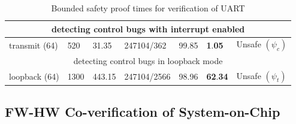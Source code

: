 \documentclass[sigconf]{acmart}
\begin{document}
\begin{table}
\begin{center}
{\begin{scriptsize}
\begin{tabular}{|l|l|l|l|l|l|l|}
\multicolumn{7}{|c|}{detecting control bugs with interrupt enabled} \\ \hline
transmit (64) & 520 & 31.35 & 247104/362 & 99.85 &
  \textbf{1}.\textbf{05} & Unsafe $(\psi_{c})$ \\ \hline
\multicolumn{7}{|c|}{detecting control bugs in loopback mode} \\ \hline
  loopback (64) & 1300 & 443.15 & 247104/2566 & 98.96 & \textbf{62}.\textbf{34}
  & Unsafe $(\psi_{t})$ \\ \hline
\end{tabular}
\end{scriptsize}
}
\end{center}
\caption{Bounded safety proof times for verification of UART 
\label{table:safe}}
\end{table}

\subsection{FW-HW Co-verification of System-on-Chip}
\end{document}

